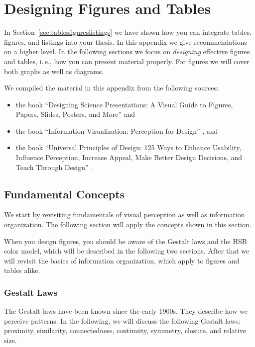  
\chapter{Designing Figures and Tables}
\label{cha:designingfigtab}

In Section~\ref{sec:tablesfigureslistings} we have shown how you can integrate tables, figures, and listings into your thesis. In this appendix we give recommendations on a higher level. In the following sections we focus on \emph{designing} effective figures and tables, i.\,e., how you can present material properly. For figures we will cover both graphs as well as diagrams.

We compiled the material in this appendix from the following sources:
\begin{itemize}
  \item the book ``Designing Science Presentations: A Visual Guide to Figures, Papers, Slides, Posters, and More'' \cite{Carter12} and
  \item the book ``Information Visualization: Perception for Design'' \cite{Ware12}, and
  \item the book ``Universal Principles of Design: 125 Ways to Enhance Usability, Influence Perception, Increase Appeal, Make Better Design Decisions, and Teach Through Design'' \cite{Lidwell10}.
\end{itemize}

\section{Fundamental Concepts}

We start by revisiting fundamentals of visual perception as well as information organization. The following section will apply the concepts shown in this section.

When you design figures, you should be aware of the Gestalt laws and the HSB color model, which will be described in the following two sections. After that we will revisit the basics of information organization, which apply to figures and tables alike.

\subsection{Gestalt Laws}

The Gestalt laws have been known since the early 1900s. They describe how we perceive patterns. In the following, we will discuss the following Gestalt laws: proximity, similarity, connectedness, continuity, symmetry, closure, and relative size.

